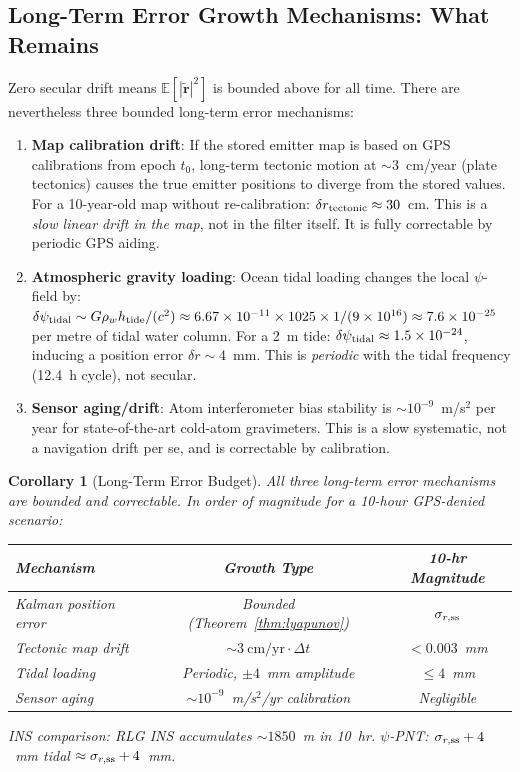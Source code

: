 \documentclass[aps,prd,twocolumn,superscriptaddress,nofootinbib]{revtex4-2}
\newtheorem{corollary}[theorem]{Corollary}
\begin{document}
\subsection{Long-Term Error Growth Mechanisms: What Remains}

Zero secular drift means $\mathbb{E}[|\tilde{\mathbf{r}}|^2]$ is bounded
above for all time.  There are nevertheless three bounded long-term
error mechanisms:

\begin{enumerate}
\item \textbf{Map calibration drift}: If the stored emitter map is
  based on GPS calibrations from epoch $t_0$, long-term tectonic motion
  at $\sim 3$~cm/year (plate tectonics) causes the true emitter
  positions to diverge from the stored values.  For a 10-year-old map
  without re-calibration: $\delta r_{\rm tectonic} \approx 30$~cm.
  This is a \emph{slow linear drift in the map}, not in the filter
  itself.  It is fully correctable by periodic GPS aiding.

\item \textbf{Atmospheric gravity loading}: Ocean tidal loading changes
  the local $\psi$-field by:
  $\delta\psi_{\rm tidal} \sim G\rho_w h_{\rm tide}/(c^2) \approx
  6.67\times10^{-11}\times1025\times1/(9\times10^{16})
  \approx 7.6\times10^{-25}$
  per metre of tidal water column.  For a 2~m tide:
  $\delta\psi_{\rm tidal} \approx 1.5\times10^{-24}$, inducing a
  position error $\delta r \sim 4$~mm.  This is \emph{periodic} with
  the tidal frequency (12.4~h cycle), not secular.

\item \textbf{Sensor aging/drift}: Atom interferometer bias stability
  is $\sim 10^{-9}$~m/s$^2$ per year for state-of-the-art cold-atom
  gravimeters.  This is a slow systematic, not a navigation drift per
  se, and is correctable by calibration.
\end{enumerate}

\begin{corollary}[Long-Term Error Budget]
\label{cor:long-term}
All three long-term error mechanisms are bounded and correctable.
In order of magnitude for a 10-hour GPS-denied scenario:
\begin{center}
\begin{tabular}{lcc}
\toprule
Mechanism & Growth Type & 10-hr Magnitude \\
\midrule
Kalman position error & Bounded (Theorem~\ref{thm:lyapunov}) & $\sigma_{r,\rm ss}$ \\
Tectonic map drift & $\sim 3~\mathrm{cm/yr} \cdot \Delta t$ & $<0.003$~mm \\
Tidal loading & Periodic, $\pm 4$~mm amplitude & $\leq 4$~mm \\
Sensor aging & $\sim 10^{-9}$~m/s$^2$/yr calibration & Negligible \\
\bottomrule
\end{tabular}
\end{center}
INS comparison: RLG INS accumulates $\sim 1850$~m in 10~hr.
$\psi$-PNT: $\sigma_{r,\rm ss} + 4$~mm tidal $\approx \sigma_{r,\rm ss} + 4$~mm.
\end{corollary}
\end{document}
